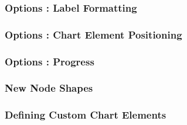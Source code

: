 \documentclass[ aspectratio=169,  12pt,blue,xcolor=pdftex,dvipsnames,table,handout,notes]{beamer}
\begin{document}
		\begin{frame}[t]
		\frametitle{Options : Label Formatting}



		\end{frame}


		\begin{frame}[t]
		\frametitle{Options : Chart Element Positioning}



		\end{frame}


		\begin{frame}[t]
		\frametitle{Options : Progress}



		\end{frame}



		\begin{frame}[t]
		\frametitle{New Node Shapes}



		\end{frame}

		\begin{frame}[t]
		\frametitle{Defining Custom Chart Elements}



		\end{frame}
\end{document}
